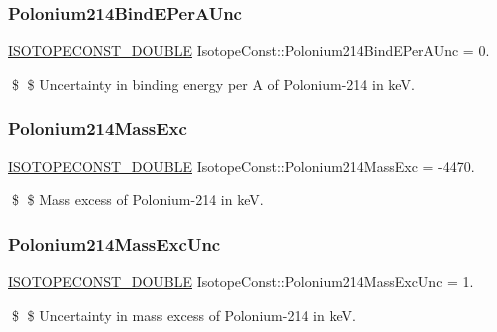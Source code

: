 \subsubsection{\texorpdfstring{Polonium214\+Bind\+E\+Per\+A\+Unc}{Polonium214BindEPerAUnc}}
{\footnotesize\ttfamily \mbox{\hyperlink{group___isotope_const-_macros_ga8f45a7272ce02c0b4c65c44636ed719a}{I\+S\+O\+T\+O\+P\+E\+C\+O\+N\+S\+T\+\_\+\+D\+O\+U\+B\+LE}} Isotope\+Const\+::\+Polonium214\+Bind\+E\+Per\+A\+Unc = 0.}

\$ \$ Uncertainty in binding energy per A of Polonium-\/214 in keV. \mbox{\label{group___isotope_const-_polonium-_po214_ga891eb170e9c56c8b2a89379927aa3326}} 
\subsubsection{\texorpdfstring{Polonium214\+Mass\+Exc}{Polonium214MassExc}}
{\footnotesize\ttfamily \mbox{\hyperlink{group___isotope_const-_macros_ga8f45a7272ce02c0b4c65c44636ed719a}{I\+S\+O\+T\+O\+P\+E\+C\+O\+N\+S\+T\+\_\+\+D\+O\+U\+B\+LE}} Isotope\+Const\+::\+Polonium214\+Mass\+Exc = -\/4470.}

\$ \$ Mass excess of Polonium-\/214 in keV. \mbox{\label{group___isotope_const-_polonium-_po214_ga7b2d7571d1a70217020977dd2dd9b252}} 
\subsubsection{\texorpdfstring{Polonium214\+Mass\+Exc\+Unc}{Polonium214MassExcUnc}}
{\footnotesize\ttfamily \mbox{\hyperlink{group___isotope_const-_macros_ga8f45a7272ce02c0b4c65c44636ed719a}{I\+S\+O\+T\+O\+P\+E\+C\+O\+N\+S\+T\+\_\+\+D\+O\+U\+B\+LE}} Isotope\+Const\+::\+Polonium214\+Mass\+Exc\+Unc = 1.}

\$ \$ Uncertainty in mass excess of Polonium-\/214 in keV. \mbox{\label{group___isotope_const-_polonium-_po214_ga50bfaf605987fdd560646bcad4c8de04}} 
